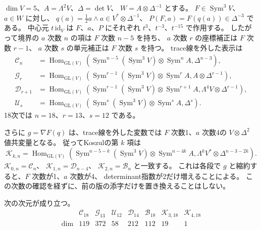 $\dim V=5$、$A=\Lambda^2V$、$\Delta=\det V$、
$W=A\otimes\Delta^{-1}$ とする。
$F\in\operatorname{Sym}^3V$、$a\in W$ に対し、
$q(a)=\tfrac12a\wedge a\in V^*\otimes\Delta^{-1}$、
$P(F,a)=F(q(a))\in\Delta^{-3}$ である。
中心元 $t\,\mathrm{id}_V$ は $F$、$a$、$P$ にそれぞれ
$t^3$、$t^{-3}$、$t^{-15}$ で作用する。
したがって境界の $a$ 次数 $n$ の項は $F$ 次数 $n-5$ を持ち、
$a$ 次数 $r$ の座標補正は $F$ 次数 $r-1$、
$a$ 次数 $s$ の単元補正は $F$ 次数 $s$ を持つ。
trace線を外した表示は
\begin{align*}
\mathcal C_n&=\operatorname{Hom}_{\mathrm{GL}(V)}
 \left(\operatorname{Sym}^{n-5}(\operatorname{Sym}^3V)
 \otimes\operatorname{Sym}^n A,\Delta^{n-3}\right),\\
\mathcal G_r&=\operatorname{Hom}_{\mathrm{GL}(V)}
 \left(\operatorname{Sym}^{r-1}(\operatorname{Sym}^3V)
 \otimes\operatorname{Sym}^r A,A\otimes\Delta^{r-1}\right),\\
\mathcal D_{r+1}&=\operatorname{Hom}_{\mathrm{GL}(V)}
 \left(\operatorname{Sym}^{r-1}(\operatorname{Sym}^3V)
 \otimes\operatorname{Sym}^{r+1} A,\Lambda^4V\otimes\Delta^{r-1}\right),\\
\mathcal U_s&=\operatorname{Hom}_{\mathrm{GL}(V)}
 \left(\operatorname{Sym}^s(\operatorname{Sym}^3V)
 \otimes\operatorname{Sym}^s A,\Delta^s\right).
\end{align*}
18次では $n=18$、$r=13$、$s=12$ である。

さらに $g=\nabla F(q)$ は、trace線を外した変数では
$F$ 次数1、$a$ 次数4の $V\otimes\Delta^2$ 値共変量となる。
従ってKoszulの第 $k$ 項は
\begin{equation}\label{eq:v14-koszul-general-term}
\mathcal K_{k,n}=
\operatorname{Hom}_{\mathrm{GL}(V)}
\left(\operatorname{Sym}^{n-5-k}(\operatorname{Sym}^3V)
 \otimes\operatorname{Sym}^{n-4k}A,
 \Lambda^kV^*\otimes\Delta^{n-3-2k}\right).
\end{equation}
$\mathcal K_{0,n}=\mathcal C_n$、
$\mathcal K_{1,n}=\mathcal D_{n-4}$、
$\mathcal K_{2,n}=\mathcal B_n$ と一致する。
これは各段で $g$ と縮約すると、$F$ 次数が1、$a$ 次数が4、
determinant指数が2だけ増えることによる。
この次数の確認を経ずに、前の版の添字だけを置き換えることはしない。

\begin{proposition}[18次の次元]\label{prop:v14-eighteenth-dimensions}
次の次元が成り立つ。
\[
\begin{array}{c|rrrrrrr}
 &\mathcal C_{18}&\mathcal G_{13}&\mathcal U_{12}&\mathcal D_{14}
 &\mathcal B_{18}&\mathcal K_{3,18}&\mathcal K_{4,18}\\\hline
\dim&119&372&58&212&112&19&1
\end{array}
\]
\end{proposition}

